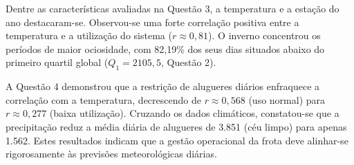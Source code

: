 \documentclass[12pt,a4paper]{article}
\begin{document}
Dentre as características avaliadas na Questão 3, a temperatura e a estação do ano destacaram-se. Observou-se uma forte correlação positiva entre a temperatura e a utilização do sistema ($r \approx 0,81$). O inverno concentrou os períodos de maior ociosidade, com 82,19\% dos seus dias situados abaixo do primeiro quartil global ($Q_1 = 2105,5$, Questão 2).

A Questão 4 demonstrou que a restrição de alugueres diários enfraquece a correlação com a temperatura, decrescendo de $r \approx 0,568$ (uso normal) para $r \approx 0,277$ (baixa utilização). Cruzando os dados climáticos, constatou-se que a precipitação reduz a média diária de alugueres de 3.851 (céu limpo) para apenas 1.562. Estes resultados indicam que a gestão operacional da frota deve alinhar-se rigorosamente às previsões meteorológicas diárias.
\end{document}
